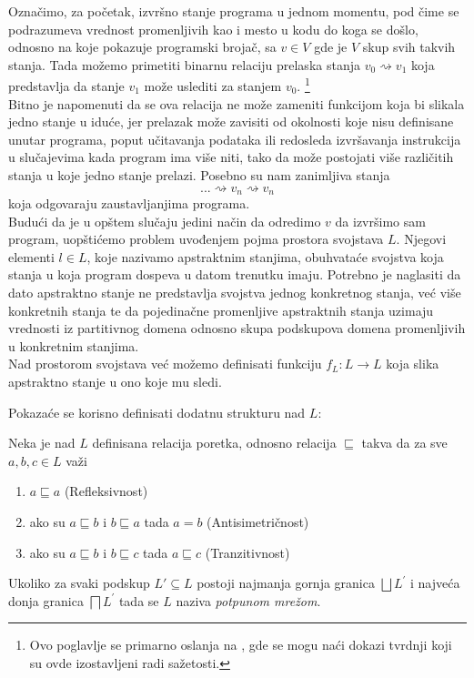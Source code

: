 Označimo, za početak, izvršno stanje programa u jednom momentu, pod čime se podrazumeva vrednost promenljivih kao i mesto u kodu do koga se došlo, odnosno na koje pokazuje programski brojač, sa $v \in V$ gde je $V$ skup svih takvih stanja. Tada možemo primetiti binarnu relaciju prelaska stanja $v_{0} \rightsquigarrow v_{1}$ koja predstavlja da stanje $v_{1}$ može uslediti za stanjem $v_{0}$. \footnote{Ovo poglavlje se primarno oslanja na \cite{salcianu}, gde se mogu naći dokazi tvrdnji koji su ovde izostavljeni radi sažetosti.} \\

Bitno je napomenuti da se ova relacija ne može zameniti funkcijom koja bi slikala jedno stanje u iduće, jer prelazak može zavisiti od okolnosti koje nisu definisane unutar programa, poput učitavanja podataka ili redosleda izvršavanja instrukcija u slučajevima kada program ima više niti, tako da može postojati više različitih stanja u koje jedno stanje prelazi. Posebno su nam zanimljiva stanja $$... \rightsquigarrow v_{n} \rightsquigarrow v_{n}$$ koja odgovaraju zaustavljanjima programa. \\
 
Budući da je u opštem slučaju jedini način da odredimo $v$ da izvršimo sam program, uopštićemo problem uvođenjem pojma prostora svojstava $L$. Njegovi elementi $l \in L$, koje nazivamo apstraktnim stanjima, obuhvataće svojstva koja stanja u koja program dospeva u datom trenutku imaju. Potrebno je naglasiti da dato apstraktno stanje ne predstavlja svojstva jednog konkretnog stanja, već više konkretnih stanja te da pojedinačne promenljive apstraktnih stanja uzimaju vrednosti iz partitivnog domena odnosno skupa podskupova domena promenljivih u konkretnim stanjima.\cite{denotationalsemantics} \\

Nad prostorom svojstava već možemo definisati funkciju $f_{L}:L\rightarrow L$ koja slika apstraktno stanje u ono koje mu sledi.

Pokazaće se korisno definisati dodatnu strukturu nad $L$: \\
\begin{definicija}
Neka je nad $L$ definisana relacija poretka, odnosno relacija $\sqsubseteq$ takva da za sve $a, b, c \in L$ važi
\begin{enumerate}
\item $a \sqsubseteq a$ (Refleksivnost)
\item ako su $a \sqsubseteq b$ i $b \sqsubseteq a$ tada $a = b$ (Antisimetričnost)
\item ako su $a \sqsubseteq b$ i $b \sqsubseteq c$ tada $a \sqsubseteq c$ (Tranzitivnost)
\end{enumerate}
Ukoliko za svaki podskup $L\prime \subseteq L$ postoji najmanja gornja granica $\bigsqcup L^{\prime}$ i najveća donja granica $\bigsqcap L^{\prime}$ tada se $L$ naziva \emph{potpunom mrežom}. \cite{algebra}
\end{definicija} 

